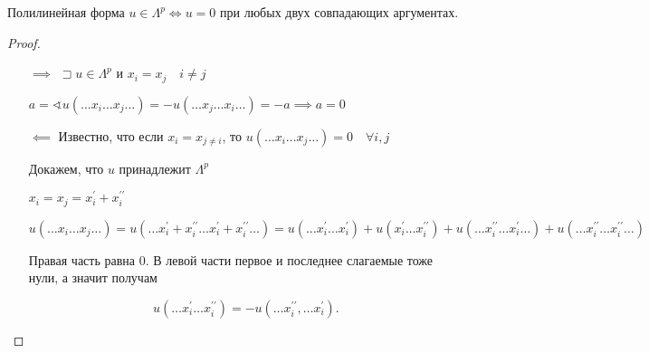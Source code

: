 \documentclass{book}
\newcommand{\p}[1]{#1^{\prime}}
\newcommand{\pp}[1]{#1^{\prime\prime}}
\theoremstyle{definition}
\begin{document}
    \begin{lemma}
        Полилинейная форма $u\in \Lambda^p \iff u = 0$ при любых двух совпадающих аргументах.
    \end{lemma}
    \begin{proof}
        \begin{itemize}
            \item []
            \item [$\implies $]
        $\sqsupset u\in \Lambda^p$ и $x_i = x_j\quad i\neq j$

        $a = \sphericalangle u\left( \ldots x_i \ldots x_j \ldots \right) = - u\left( \ldots x_j \ldots x_i \ldots \right) = -a \implies  a = 0$
    \item [$\impliedby $] Известно, что если $x_i = x_{j\neq i}$, то $u\left( \ldots x_i \ldots x_j \ldots \right)  = 0\quad \forall i, j$

        Докажем, что $u$ принадлежит  $\Lambda^p$

         $x_i = x_j = \p x_i + \pp x_i$

         $u\left( \ldots x_i \ldots x_j \ldots \right)  = u\left( \ldots \p x_i + \pp x_i \ldots \p x_i + \pp x_i\ldots \right) = u\left( \ldots \p x_i \ldots \p x_i \right) + u\left( \p x_i \ldots \pp x_i \right)  + u\left( \ldots \pp x_i \ldots \p x_i \ldots \right)  + u\left( \ldots \pp x_i \ldots \pp x_i \ldots \right)  $

         Правая часть равна 0. В левой части первое и последнее слагаемые тоже нули, а значит получам 

         \[
             u\left( \ldots \p x_i \ldots \pp x_i \right)  = -u\left( \ldots \pp x_i, \ldots \p x_i \right) 
         .\] 

         
        \end{itemize}
        
    \end{proof}
\end{document}
